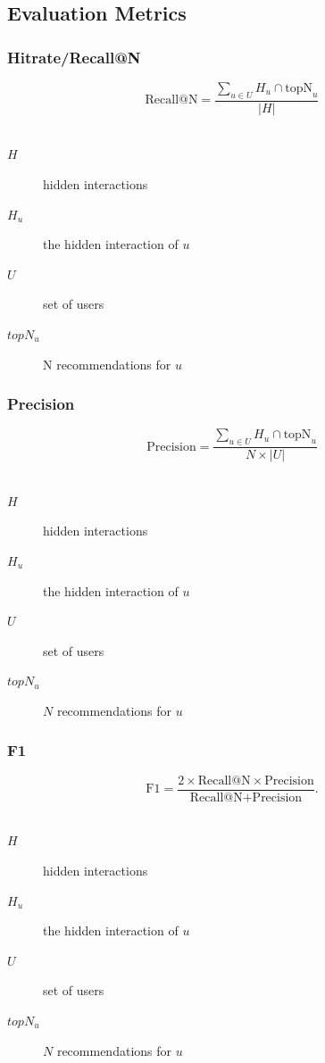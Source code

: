 \documentclass[mathserif]{beamer}
\begin{document}
\subsection{Evaluation Metrics}
\begin{frame} 
\frametitle{Hitrate/Recall@N~\cite{Karypis:2001:EIT:502585.502627, Sarwar00applicationof}}
\begin{equation} 
\text{Recall@N}=\frac{\sum_{u \in U} H_u \cap \text{topN}_u}{|H|}
\end{equation}\\
\vspace{6.4mm}
\begin{description}
    \item[$H$] hidden interactions\\
    \item[$H_u$] the hidden interaction of $u$\\
    \item[$U$] set of users
    \item[$topN_u$] N recommendations for $u$
\end{description}
\end{frame}

\begin{frame} 
\frametitle{Precision~\cite{Sarwar00applicationof}}
\begin{equation} 
\text{Precision}=\frac{\sum_{u \in U} H_u \cap \text{topN}_u}{N \times |U|}
\end{equation}\\
\vspace{6.4mm}
\begin{description}
    \item[$H$] hidden interactions\\
    \item[$H_u$] the hidden interaction of $u$\\
    \item[$U$] set of users
    \item[$topN_u$] $N$ recommendations for $u$
\end{description}
\end{frame}

\begin{frame} 
    \frametitle{F1~\cite{Sarwar00applicationof}}
\begin{equation} 
\text{F1}=\frac{2 \times \text{Recall@N} \times 
\text{Precision}}{\text{Recall@N} + \text{Precision}}.
\end{equation}\\
\vspace{6.4mm}
\begin{description}
    \item[$H$] hidden interactions\\
    \item[$H_u$] the hidden interaction of $u$\\
    \item[$U$] set of users
    \item[$topN_u$] $N$ recommendations for $u$
\end{description}
\end{frame}
\end{document}
